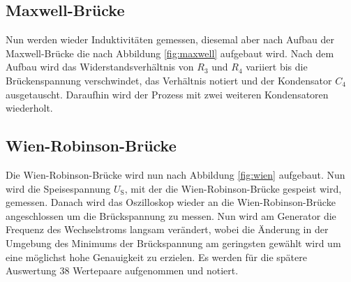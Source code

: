 \subsection{Maxwell-Brücke}

Nun werden wieder Induktivitäten gemessen, diesemal aber nach Aufbau der Maxwell-Brücke die nach Abbildung \ref{fig:maxwell} aufgebaut wird.
Nach dem Aufbau wird das Widerstandsverhältnis von $R_3$ und $R_4$ variiert bis die Brückenspannung verschwindet, das Verhältnis notiert und der Kondensator $C_4$ ausgetauscht.
Daraufhin wird der Prozess mit zwei weiteren Kondensatoren wiederholt.

\subsection{Wien-Robinson-Brücke}

Die Wien-Robinson-Brücke wird nun nach Abbildung \ref{fig:wien} aufgebaut. 
Nun wird die Speisespannung $U_\text{S}$, mit der die Wien-Robinson-Brücke gespeist wird, gemessen.
Danach wird das Oszilloskop wieder an die Wien-Robinson-Brücke angeschlossen um die Brückspannung zu messen.
Nun wird am Generator die Frequenz des Wechselstroms langsam verändert, wobei die Änderung in der Umgebung des Minimums der Brückspannung am geringsten gewählt wird um eine möglichst hohe Genauigkeit zu erzielen. 
Es werden für die spätere Auswertung 38 Wertepaare aufgenommen und notiert.



 
